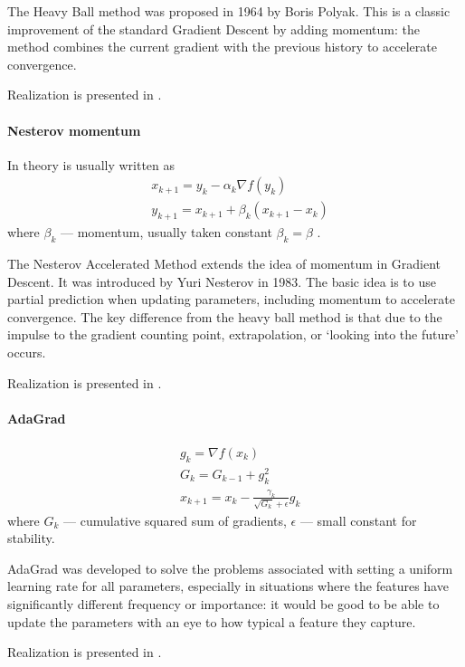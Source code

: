 \documentclass{article}
\begin{document}
The Heavy Ball method was proposed in 1964 by Boris Polyak. This is a classic improvement of the standard Gradient Descent by adding momentum: the method combines the current gradient with the previous history to accelerate convergence.

Realization is presented in .

\paragraph{Nesterov momentum}
In theory is usually written as
\begin{align*}
   & x_{k+1} = y_k - \alpha_k  \nabla f(y_k)     \\
   & y_{k+1} = x_{k+1} + \beta_k (x_{k+1} - x_k)
\end{align*}
where $\beta_k$ --- momentum, usually taken constant $\beta_k = \beta$ .

The Nesterov Accelerated Method extends the idea of momentum in Gradient Descent. It was introduced by Yuri Nesterov in 1983. The basic idea is to use partial prediction when updating parameters, including momentum to accelerate convergence. The key difference from the heavy ball method is that due to the impulse to the gradient counting point, extrapolation, or `looking into the future' occurs.

Realization is presented in .

\paragraph{AdaGrad}
\begin{align*}
   & g_k = \nabla f(x_k)                                       \\
   & G_k = G_{k-1} + g_k^2                                     \\
   & x_{k+1} = x_k - \frac{\gamma_k}{\sqrt{G_k}+ \epsilon} g_k
\end{align*}
where $G_k$ --- cumulative squared sum of gradients, $\epsilon$ --- small constant for stability.

AdaGrad was developed to solve the problems associated with setting a uniform learning rate for all parameters, especially in situations where the features have significantly different frequency or importance: it would be good to be able to update the parameters with an eye to how typical a feature they capture.

Realization is presented in .
\end{document}
